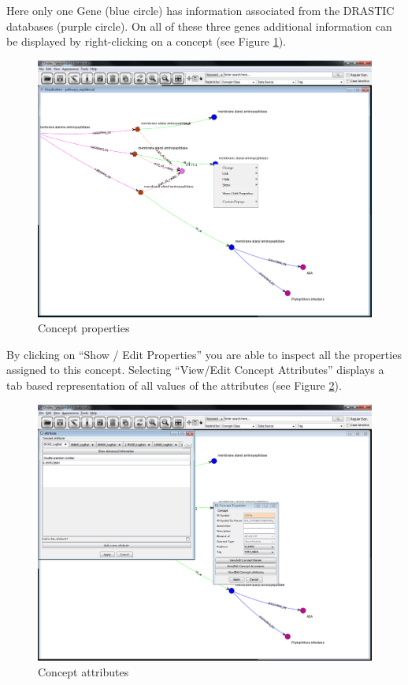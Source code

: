 Here only one Gene (blue circle) has information associated from the DRASTIC databases (purple circle). 
On all of these three genes additional information can be displayed by right-clicking on a concept (see Figure \ref{fig:properties}).

\begin{figure}[H]
\centering
\includegraphics[scale=0.35]{images/Oct12/app1fig7.png} 
\caption{Concept properties}
\label{fig:properties}
\end{figure}

By clicking on ``Show / Edit Properties'' you are able to inspect all the properties assigned to this concept. 
Selecting ``View/Edit Concept Attributes'' displays a tab based representation of all values of the attributes (see Figure \ref{fig:gds}).

\begin{figure}[H]
\centering
\includegraphics[scale=0.35]{images/Oct12/app1fig8.png} 
\caption{Concept attributes}
\label{fig:gds}
\end{figure}

